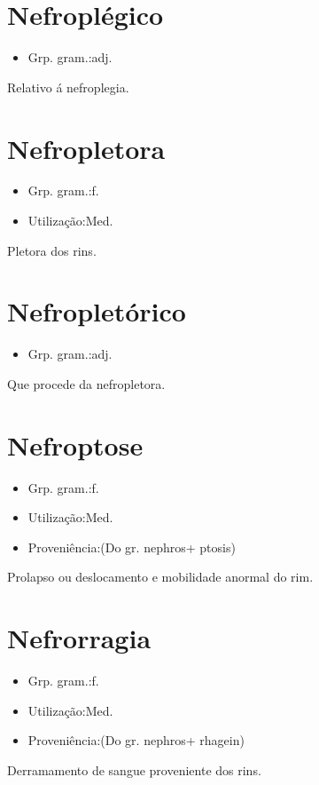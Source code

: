 \section{Nefroplégico}
\begin{itemize}
\item {Grp. gram.:adj.}
\end{itemize}
Relativo á nefroplegia.
\section{Nefropletora}
\begin{itemize}
\item {Grp. gram.:f.}
\end{itemize}
\begin{itemize}
\item {Utilização:Med.}
\end{itemize}
Pletora dos rins.
\section{Nefropletórico}
\begin{itemize}
\item {Grp. gram.:adj.}
\end{itemize}
Que procede da nefropletora.
\section{Nefroptose}
\begin{itemize}
\item {Grp. gram.:f.}
\end{itemize}
\begin{itemize}
\item {Utilização:Med.}
\end{itemize}
\begin{itemize}
\item {Proveniência:(Do gr. \textunderscore nephros\textunderscore  + \textunderscore ptosis\textunderscore )}
\end{itemize}
Prolapso ou deslocamento e mobilidade anormal do rim.
\section{Nefrorragia}
\begin{itemize}
\item {Grp. gram.:f.}
\end{itemize}
\begin{itemize}
\item {Utilização:Med.}
\end{itemize}
\begin{itemize}
\item {Proveniência:(Do gr. \textunderscore nephros\textunderscore  + \textunderscore rhagein\textunderscore )}
\end{itemize}
Derramamento de sangue proveniente dos rins.
